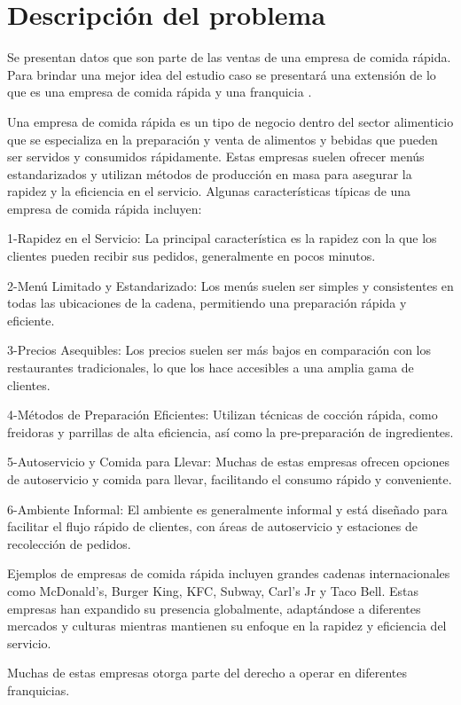 \documentclass[
  us-letterpaper,
]{scrreprt}
\theoremstyle{definition}
\theoremstyle{plain}
\theoremstyle{plain}
\theoremstyle{remark}
\begin{document}
\section{Descripción del problema}\label{descripciuxf3n-del-problema}

Se presentan datos que son parte de las ventas de una empresa de comida
rápida. Para brindar una mejor idea del estudio caso se presentará una
extensión de lo que es una empresa de comida rápida y una franquicia .

Una empresa de comida rápida es un tipo de negocio dentro del sector
alimenticio que se especializa en la preparación y venta de alimentos y
bebidas que pueden ser servidos y consumidos rápidamente. Estas empresas
suelen ofrecer menús estandarizados y utilizan métodos de producción en
masa para asegurar la rapidez y la eficiencia en el servicio. Algunas
características típicas de una empresa de comida rápida incluyen:

1-Rapidez en el Servicio: La principal característica es la rapidez con
la que los clientes pueden recibir sus pedidos, generalmente en pocos
minutos.

2-Menú Limitado y Estandarizado: Los menús suelen ser simples y
consistentes en todas las ubicaciones de la cadena, permitiendo una
preparación rápida y eficiente.

3-Precios Asequibles: Los precios suelen ser más bajos en comparación
con los restaurantes tradicionales, lo que los hace accesibles a una
amplia gama de clientes.

4-Métodos de Preparación Eficientes: Utilizan técnicas de cocción
rápida, como freidoras y parrillas de alta eficiencia, así como la
pre-preparación de ingredientes.

5-Autoservicio y Comida para Llevar: Muchas de estas empresas ofrecen
opciones de autoservicio y comida para llevar, facilitando el consumo
rápido y conveniente.

6-Ambiente Informal: El ambiente es generalmente informal y está
diseñado para facilitar el flujo rápido de clientes, con áreas de
autoservicio y estaciones de recolección de pedidos.

Ejemplos de empresas de comida rápida incluyen grandes cadenas
internacionales como McDonald's, Burger King, KFC, Subway, Carl's Jr y
Taco Bell. Estas empresas han expandido su presencia globalmente,
adaptándose a diferentes mercados y culturas mientras mantienen su
enfoque en la rapidez y eficiencia del servicio.

Muchas de estas empresas otorga parte del derecho a operar en diferentes
franquicias.
\end{document}
